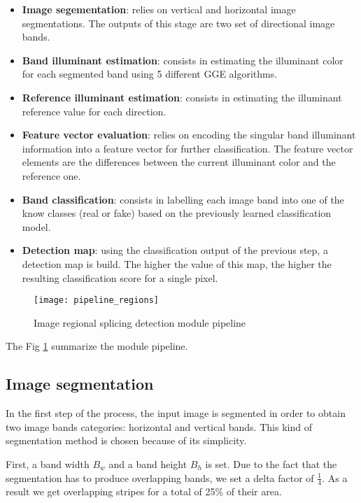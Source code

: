 \begin{itemize}
\item \textbf{Image segementation}: relies on vertical and horizontal image segmentations. The outputs of this stage are two set of directional image bands. 
\item \textbf{Band illuminant estimation}: consists in estimating the illuminant color for each segmented band using 5 different GGE algorithms.
\item \textbf{Reference illuminant estimation}: consists in estimating the illuminant reference value for each direction.
\item \textbf{Feature vector evaluation}: relies on encoding the singular band illuminant information into a feature vector for further classification. The feature vector elements are the differences between the current illuminant color and the reference one.
\item \textbf{Band classification}: consists in labelling each image band into one of the know classes (real or fake) based on the previously learned classification model.
\item \textbf{Detection map}: using the classification output of the previous step, a detection map is build. The higher the value of this map, the higher the  resulting classification score for a single pixel.
\end{itemize}

\begin{figure}[h!]
  \centering
    \texttt{[image: pipeline\_regions]}
    \caption{Image regional splicing detection module pipeline}
    \label{fig:regionsmodulepipeline}
\end{figure}

The Fig \ref{fig:regionsmodulepipeline} summarize the module pipeline.

\subsection{Image segmentation}

In the first step of the process, the input image is segmented in order to obtain two image bands categories: horizontal and vertical bands. This kind of segmentation method is chosen because of its simplicity.

First, a band width $B_w$ and a band height $B_h$ is set. Due to the fact that the segmentation has to produce overlapping bands, we set a delta factor of $\frac{1}{4}$. As a result we get overlapping stripes for a total of 25\% of their area. 

